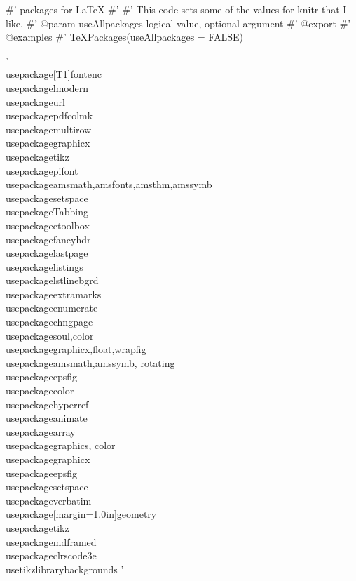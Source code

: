 #' packages for LaTeX
#'
#' This code sets some of the values for knitr that I like.
#' @param useAllpackages logical value, optional argument
#' @export
#' @examples
#' TeXPackages(useAllpackages = FALSE)

'
\\usepackage[T1]{fontenc}
\\usepackage{lmodern}
\\usepackage{url}
\\usepackage{pdfcolmk}
\\usepackage{multirow}
\\usepackage{graphicx}
\\usepackage{tikz}
\\usepackage{pifont}
\\usepackage{amsmath,amsfonts,amsthm,amssymb}
\\usepackage{setspace}
\\usepackage{Tabbing}
\\usepackage{etoolbox}
\\usepackage{fancyhdr}
\\usepackage{lastpage}
\\usepackage{listings}
\\usepackage{lstlinebgrd}
\\usepackage{extramarks}
\\usepackage{enumerate}
\\usepackage{chngpage}
\\usepackage{soul,color}
\\usepackage{graphicx,float,wrapfig}
\\usepackage{amsmath,amssymb, rotating}
\\usepackage{epsfig}
\\usepackage{color}
\\usepackage{hyperref}
\\usepackage{animate}
\\usepackage{array}
\\usepackage{graphics, color}
\\usepackage{graphicx}
\\usepackage{epsfig}
\\usepackage{setspace}
\\usepackage{verbatim}
\\usepackage[margin=1.0in]{geometry}
\\usepackage{tikz}
\\usepackage{mdframed}
\\usepackage{clrscode3e}
\\usetikzlibrary{backgrounds}
'

